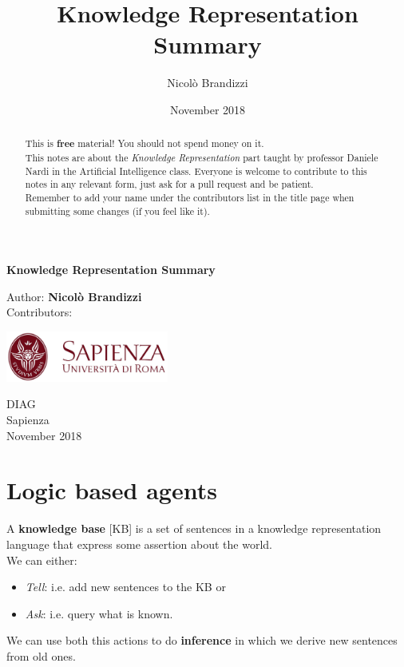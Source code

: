 \documentclass[10pt,a4paper]{article}
\author{Nicolò Brandizzi}
\title{Knowledge Representation Summary}
\date{November 2018}
\begin{document}
\begin{titlepage}
    \begin{center}
        \vspace*{1cm}
        
        \Huge
        \textbf{Knowledge Representation Summary}
        
        
        \vspace{1.5cm}
        
        Author:
        \textbf{Nicolò Brandizzi}\\
        \vspace{0.5cm}
        \Large
        Contributors:
        \textbf{}%
        
        \vfill
        
        \includegraphics[width=0.4\textwidth]{images/sapienza_logo.jpg}


        
        \vfill
        
  

        \vspace{0.8cm}
        
        
        \Large
        DIAG\\
        Sapienza\\
        November 2018

    \end{center}
\end{titlepage}


\tableofcontents
\newpage
\begin{abstract}
This is \textbf{free} material! You should not spend money on it.\\
This notes are about the \textit{Knowledge Representation} part taught by professor Daniele Nardi in the Artificial Intelligence class. Everyone is welcome to contribute to this notes in any relevant form, just ask for a pull request and be patient.\\ Remember to add your name under the contributors list in the title page when submitting some changes (if you feel like it).
\end{abstract}

\section{Logic based agents}
A \textbf{knowledge base} [KB] is a set of sentences in a knowledge representation language that express some assertion about the world.\\
We can either:
\begin{itemize}
\item \textit{Tell}: i.e. add new sentences to the KB or
\item \textit{Ask}: i.e. query what is known.
\end{itemize}
We can use both this actions to do \textbf{inference} in which we derive new sentences from old ones.\\
\end{document}
